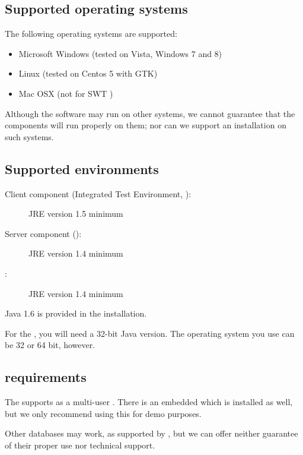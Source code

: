 
\subsection{Supported operating systems}
The following operating systems are supported:
\begin{itemize}
  \item Microsoft Windows (tested on Vista, Windows 7 and 8)
  \item  Linux (tested on Centos 5 with GTK)
  \item Mac OSX (not for SWT \gdauts{})%

\end{itemize}

Although the software may run on other systems, we cannot guarantee that the components will run properly on them; nor can we support an installation on such systems.

\subsection{Supported  environments}
\begin{description}
\item [Client component (Integrated Test Environment, \ite{}):]{JRE version 1.5 minimum}
\item [Server component (\gdagent):]{JRE version 1.4 minimum}
\item [\gdaut{}:]{JRE version 1.4 minimum}
\end{description}
Java 1.6 is provided in the  installation.  

For the \ite{}, you will need a 32-bit Java version. The operating system you use can be 32 or 64 bit, however. 

\subsection{\gdDB requirements}
The \ite{} supports   as a multi-user \gddb{}. There is an embedded \gddb{} which is installed as well, but we only recommend using this for demo purposes. 

Other databases may work, as supported by , but we can offer neither guarantee of their proper use nor technical support. 

